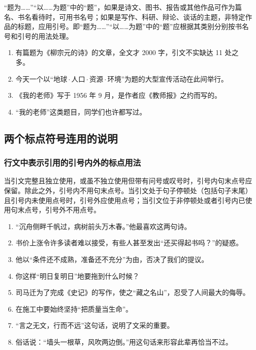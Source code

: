 \documentclass[a4paper]{article}
\begin{document}
“题为……”“以……为题”中的“题”，如果是诗文、图书、报告或其他作品可作为篇名、书名看待时，可用书名号；如果是写作、科研、辩论、谈话的主题，非特定作品的标题，应用引号。即“题为……”“以……为题”中的“题”应根据其类别分别按书名号和引号的用法处理。

\begin{enumerate}
    \item 有篇题为《柳宗元的诗》的文章，全文才 2000 字，引文不实缺达 11 处之多。
    \item 今天一个以“地球\,$\cdot$\,人口\,$\cdot$\,资源\,$\cdot$\,环境”为题的大型宣传活动在此间举行。
    \item 《我的老师》写于 1956 年 9 月，是作者应《教师报》之约而写的。
    \item “我的老师”这类题目，同学们也许都写过。
\end{enumerate}

\subsection{两个标点符号连用的说明}

\subsubsection{行文中表示引用的引号内外的标点用法}

当引文完整且独立使用，或虽不独立使用但带有问号或叹号时，引号内句末点号应保留。除此之外，引号内不用句末点号。当引文处于句子停顿处（包括句子末尾）且引号内未使用点号时，引号外应使用点号；当引文位于非停顿处或者引号内已使用句末点号，引号外不用点号。

\begin{enumerate}
    \item “沉舟侧畔千帆过，病树前头万木春。”他最喜欢这两句诗。
    \item 书价上涨令许多读者难以接受，有些人甚至发出“还买得起书吗？”的疑惑。
    \item 他以“条件还不成熟，准备还不充分”为由，否决了我们的提议。
    \item 你这样“明日复明日”地要拖到什么时候？
    \item 司马迁为了完成《史记》的写作，使之“藏之名山”，忍受了人间最大的侮辱。
    \item 在施工中要始终坚持“把质量当生命”。
    \item “言之无文，行而不远”这句话，说明了文采的重要。
    \item 俗话说：“墙头一根草，风吹两边倒。”用这句话来形容此辈再恰当不过。
\end{enumerate}
\end{document}
